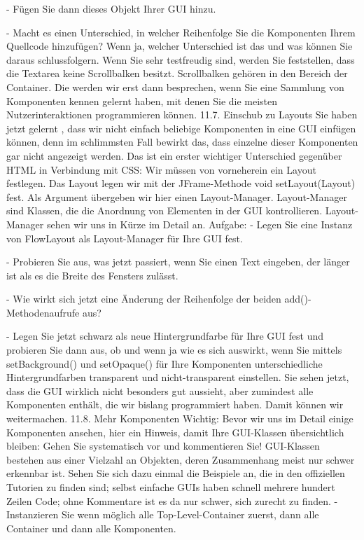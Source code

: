 -	Fügen Sie dann dieses Objekt Ihrer GUI hinzu.

-	Macht es einen Unterschied, in welcher Reihenfolge Sie die Komponenten Ihrem Quellcode hinzufügen? Wenn ja, welcher Unterschied ist das und was können Sie daraus schlussfolgern.
Wenn Sie sehr testfreudig sind, werden Sie feststellen, dass die Textarea keine Scrollbalken besitzt. Scrollbalken gehören in den Bereich der Container. Die werden wir erst dann besprechen, wenn Sie eine Sammlung von Komponenten kennen gelernt haben, mit denen Sie die meisten Nutzerinteraktionen programmieren können.
11.7.	Einschub zu Layouts
Sie haben jetzt gelernt , dass wir nicht einfach beliebige Komponenten in eine GUI einfügen können, denn im schlimmsten Fall bewirkt das, dass einzelne dieser Komponenten gar nicht angezeigt werden. Das ist ein erster wichtiger Unterschied gegenüber HTML in Verbindung mit CSS: Wir müssen von vorneherein ein Layout festlegen.
Das Layout legen wir mit der JFrame-Methode void setLayout(Layout) fest. Als Argument übergeben wir hier einen Layout-Manager. Layout-Manager sind Klassen, die die Anordnung von Elementen in der GUI kontrollieren.
Layout-Manager sehen wir uns in Kürze im Detail an.
Aufgabe:
-	Legen Sie eine Instanz von FlowLayout als Layout-Manager für Ihre GUI fest.

-	Probieren Sie aus, was jetzt passiert, wenn Sie einen Text eingeben, der länger ist als es die Breite des Fensters zulässt.

-	Wie wirkt sich jetzt eine Änderung der Reihenfolge der beiden add()-Methodenaufrufe aus?

-	Legen Sie jetzt schwarz als neue Hintergrundfarbe für Ihre GUI fest und probieren Sie dann aus, ob und wenn ja wie es sich auswirkt, wenn Sie mittels setBackground() und setOpaque() für Ihre Komponenten unterschiedliche Hintergrundfarben transparent und nicht-transparent einstellen.
Sie sehen jetzt, dass die GUI wirklich nicht besonders gut aussieht, aber zumindest alle Komponenten enthält, die wir bislang programmiert haben. Damit können wir weitermachen.
11.8.	Mehr Komponenten
Wichtig: Bevor wir uns im Detail einige Komponenten ansehen, hier ein Hinweis, damit Ihre GUI-Klassen übersichtlich bleiben: 
Gehen Sie systematisch vor und kommentieren Sie! 
GUI-Klassen bestehen aus einer Vielzahl an Objekten, deren Zusammenhang meist nur schwer erkennbar ist. Sehen Sie sich dazu einmal die Beispiele an, die in den offiziellen Tutorien zu finden sind; selbst einfache GUIs haben schnell mehrere hundert Zeilen Code; ohne Kommentare ist es da nur schwer, sich zurecht zu finden.
-	Instanzieren Sie wenn möglich alle Top-Level-Container zuerst, dann alle Container und dann alle Komponenten. 


